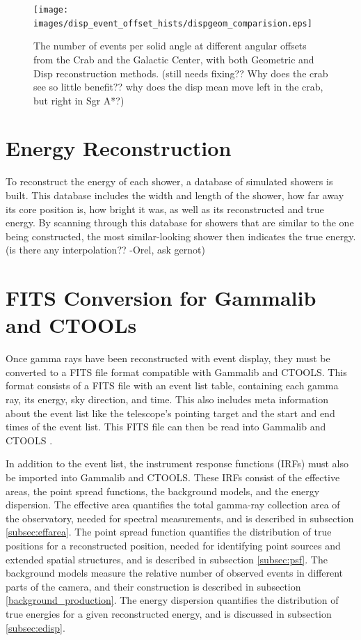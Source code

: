     \begin{figure}[ht]
      \centering
      \texttt{[image: images/disp\_event\_offset\_hists/dispgeom\_comparision.eps]}
      \caption[DISP Offset Improvement]{
        The number of events per solid angle at different angular offsets from the Crab and the Galactic Center, with both Geometric and Disp reconstruction methods.
        {\color{red} (still needs fixing??  Why does the crab see so little benefit??  why does the disp mean move left in the crab, but right in Sgr A*?) }
      }
      \label{fig:disp_event_offset}
    \end{figure}

\section{Energy Reconstruction}\label{subsec:enrecon}
  To reconstruct the energy of each shower, a database of simulated showers is built.
  This database includes the width and length of the shower, how far away its core position is, how bright it was, as well as its reconstructed and true energy.
  By scanning through this database for showers that are similar to the one being constructed, the most similar-looking shower then indicates the true energy.
  {\color{red} (is there any interpolation?? -Orel, ask gernot)}

\section{FITS Conversion for Gammalib and CTOOLs}\label{fitsconversion}
  Once gamma rays have been reconstructed with event display, they must be converted to a FITS file format compatible with Gammalib and CTOOLS.
  This format consists of a FITS file with an event list table, containing each gamma ray, its energy, sky direction, and time.
  This also includes meta information about the event list like the telescope's pointing target and the start and end times of the event list.
  This FITS file can then be read into Gammalib and CTOOLS \cite{gammalibctools}.

  In addition to the event list, the instrument response functions (IRFs) must also be imported into Gammalib and CTOOLS.
  These IRFs consist of the effective areas, the point spread functions, the background models, and the energy dispersion.
  The effective area quantifies the total gamma-ray collection area of the observatory, needed for spectral measurements, and is described in subsection \ref{subsec:effarea}.
  The point spread function quantifies the distribution of true positions for a reconstructed position, needed for identifying point sources and extended spatial structures, and is described in subsection \ref{subsec:psf}.
  The background models measure the relative number of observed events in different parts of the camera, and their construction is described in subsection \ref{background_production}.
  The energy dispersion quantifies the distribution of true energies for a given reconstructed energy, and is discussed in subsection \ref{subsec:edisp}.

